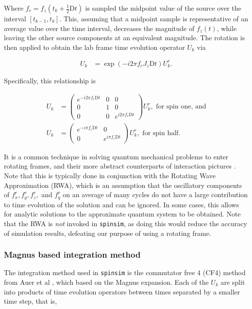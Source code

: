\documentclass{jors}
\begin{document}
			Where \(f_r = f_z(t_k + \frac12\mathrm{D}t)\) is sampled the midpoint value of the source over the interval \([t_{k - 1}, t_k]\). This, assuming that a midpoint sample is representative of an average value over the time interval, decreases the magnitude of \(f_z(t)\), while leaving the other source components at an equivalent magnitude. The rotation is then applied to obtain the lab frame time evolution operator \(U_k\) via
			
			\begin{align}
				U_k &= \exp(-i 2 \pi f_r J_z \mathrm{D}t) U^r_k.
			\end{align}

			Specifically, this relationship is

			\begin{align}
				U_k &= \begin{pmatrix}
					e^{-i 2\pi f_r \mathrm{D}t} & 0 & 0\\
					0 & 1 & 0\\
					0 & 0 & e^{i 2\pi f_r \mathrm{D}t}
				\end{pmatrix} U^r_k, \textrm{ for spin one, and}\\
				U_k &= \begin{pmatrix}
					e^{-i \pi f_r \mathrm{D}t} & 0\\
					0 & e^{i \pi f_r \mathrm{D}t}
				\end{pmatrix} U^r_k, \textrm{ for spin half.}
			\end{align}

			It is a common technique in solving quantum mechanical problems to enter rotating frames, and their more abstract counterparts of interaction pictures \cite{j_j_sakurai_jun_john_modern_1994}. Note that this is typically done in conjunction with the Rotating Wave Approximation (RWA), which is an assumption that the oscillatory components of \(f^r_x, f^r_y, f^r_z,\) and \(f^r_q\) on an average of many cycles do not have a large contribution to time evolution of the solution and can be ignored. In some cases, this allows for analytic solutions to the approximate quantum system to be obtained. Note that the RWA is \emph{not} invoked in \texttt{spinsim}, as doing this would reduce the accuracy of simulation results, defeating our purpose of using a rotating frame.
			
		\subsubsection*{Magnus based integration method}
			The integration method used in \texttt{spinsim} is the commutator free 4 (CF4) method from Auer et al \cite{auer_magnus_2018}, which based on the Magnus expansion. Each of the \(U_k\) are split into products of time evolution operators between times separated by a smaller time step, that is,
			
\end{document}
